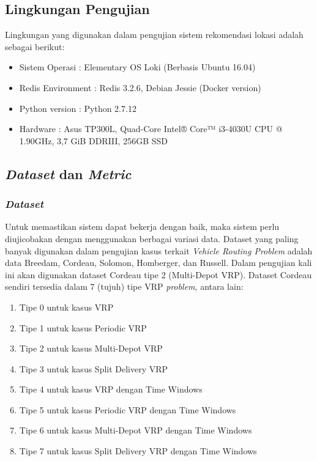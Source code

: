 \subsection{Lingkungan Pengujian}
\label{ssec:test-environment}
Lingkungan yang digunakan dalam pengujian sistem rekomendasi lokasi adalah sebagai berikut:
\begin{itemize}
\item Sistem Operasi		: Elementary OS Loki (Berbasis Ubuntu 16.04)
\item Redis Environment		: Redis 3.2.6, Debian Jessie (Docker version)
\item Python version		: Python 2.7.12
\item Hardware				: Asus TP300L, Quad-Core Intel® Core™ i3-4030U CPU @ 1.90GHz, 3,7 GiB DDRIII, 256GB SSD
\end{itemize}


\subsection{\textit{Dataset} dan \textit{Metric}}
\subsubsection{\textit{Dataset}}
Untuk memastikan sistem dapat bekerja dengan baik, maka sistem perlu diujicobakan dengan menggunakan berbagai variasi data. Dataset yang paling banyak digunakan dalam pengujian kasus terkait \textit{Vehicle Routing Problem} adalah data Breedam, Cordeau, Solomon, Homberger, dan Russell. Dalam pengujian kali ini akan digunakan dataset Cordeau tipe 2 (Multi-Depot VRP). Dataset Cordeau sendiri tersedia dalam 7 (tujuh) tipe VRP \textit{problem}, antara lain: 

\begin{enumerate}
\item Tipe 0 untuk kasus VRP
\item Tipe 1 untuk kasus Periodic VRP
\item Tipe 2 untuk kasus Multi-Depot VRP
\item Tipe 3 untuk kasus Split Delivery VRP
\item Tipe 4 untuk kasus VRP dengan Time Windows
\item Tipe 5 untuk kasus Periodic VRP dengan Time Windows
\item Tipe 6 untuk kasus Multi-Depot VRP dengan Time Windows
\item Tipe 7 untuk kasus Split Delivery VRP dengan Time Windows
\end{enumerate}


